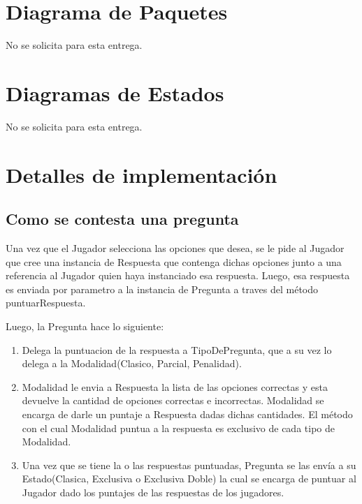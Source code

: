 \documentclass[titlepage,a4paper]{article}
\begin{document}
\section{Diagrama de Paquetes}

No se solicita para esta entrega.

\section{Diagramas de Estados}

No se solicita para esta entrega.

\section{Detalles de implementación}

\subsection{Como se contesta una pregunta}

Una vez que el Jugador selecciona las opciones que desea, se le pide al Jugador que cree una instancia de Respuesta que contenga dichas opciones junto a una referencia al Jugador quien haya instanciado esa respuesta. Luego, esa respuesta es enviada por parametro a la instancia de Pregunta a traves del método puntuarRespuesta.

Luego, la Pregunta hace lo siguiente:

\begin{enumerate}
\item Delega la puntuacion de la respuesta a TipoDePregunta, que a su vez lo delega a la Modalidad(Clasico, Parcial, Penalidad).
\item Modalidad le envia a Respuesta la lista de las opciones correctas y esta devuelve la cantidad de opciones correctas e incorrectas. Modalidad se encarga de darle un puntaje a Respuesta dadas dichas cantidades. El método con el cual Modalidad puntua a la respuesta es exclusivo de cada tipo de Modalidad.
\item Una vez que se tiene la o las respuestas puntuadas, Pregunta se las envía a su Estado(Clasica, Exclusiva o Exclusiva Doble) la cual se encarga de puntuar al Jugador dado los puntajes de las respuestas de los jugadores.
\end{enumerate}
\end{document}
